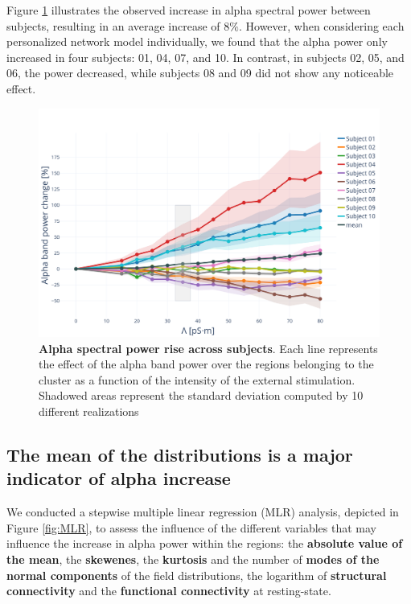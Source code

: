 \documentclass[../main.tex]{subfiles}
\begin{document}
Figure \ref{fig:alpha-rise-cluster} illustrates the observed increase in alpha spectral power between subjects, resulting in an average increase of $8\%$.
However, when considering each personalized network model individually, we found that the alpha power only increased in four subjects: 01, 04, 07, and 10.
In contrast, in subjects 02, 05, and 06, the power decreased, while subjects 08 and 09 did not show any noticeable effect.
\begin{figure}[htbp]
    \centering
    \includegraphics[width=\textwidth]{chapter3/figures/alpha_rise_cluster.png}
    \caption{\textbf{Alpha spectral power rise across subjects}.
    Each line represents the effect of the alpha band power over the regions belonging to the cluster
    as a function of the intensity of the external stimulation.
    Shadowed areas represent the standard deviation computed by 10 different realizations}
    \label{fig:alpha-rise-cluster}
\end{figure}
\clearpage 

\subsection{The mean of the distributions is a major indicator of alpha increase}
We conducted a stepwise multiple linear regression (MLR) analysis, depicted in Figure \ref{fig:MLR}, to assess the influence of the different variables that may influence the increase in alpha power within the regions: the \textbf{absolute value of the mean}, the \textbf{skewenes}, the \textbf{kurtosis} and the number of \textbf{modes of the normal components} of the field distributions,
the logarithm of \textbf{structural connectivity} and the \textbf{functional connectivity} at resting-state.
\end{document}
